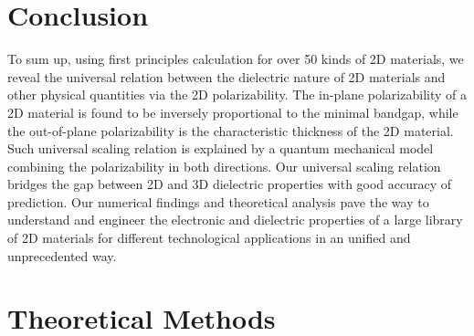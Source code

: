 \documentclass[journal=ancac3,manuscript=article,email=true,hyperref=true,keywords=false]{achemso}
\begin{document}
\section{Conclusion}
\label{sec:org5fd1f1a}

To sum up, using first principles calculation for over 50 kinds of 2D
materials, we reveal the universal relation between the dielectric
nature of 2D materials and other physical quantities via the 2D
polarizability. The in-plane polarizability of a 2D material is found
to be inversely proportional to the minimal bandgap, while the
out-of-plane polarizability is the characteristic thickness of the 2D
material. Such universal scaling relation is explained by a quantum
mechanical model combining the polarizability in both directions. Our
universal scaling relation bridges the gap between 2D and 3D
dielectric properties with good accuracy of prediction.  Our numerical
findings and theoretical analysis pave the way to understand and
engineer the electronic and dielectric properties of a large library
of 2D materials for different technological applications in an
unified and unprecedented way.

\section{Theoretical Methods}
\label{sec:org8457dbb}
\end{document}
